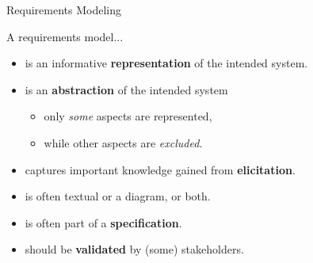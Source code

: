 

\begin{Slide}{Requirements Modeling}

A requirements model...

\begin{itemize}
\item  is an informative \textbf{representation} of the intended system.

\item is an \textbf{abstraction} of the intended system 
\begin{itemize}
\item only \textit{some} aspects are represented, 
\item while other aspects are \textit{excluded}.

\end{itemize}
\item captures important knowledge gained from \textbf{elicitation}.

\item is often textual or a diagram, or both.

\item is often part of a \textbf{specification}.

\item should be \textbf{validated} by (some) stakeholders.

\end{itemize}
\end{Slide}
